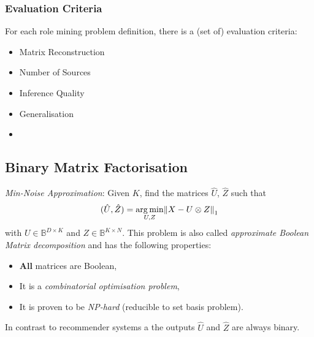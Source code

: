\subsubsection{Evaluation Criteria}
For each role mining problem definition, there is a (set of) evaluation criteria:
\begin{itemize}
\item Matrix Reconstruction
\item Number of Sources
\item Inference Quality
\item Generalisation
\item 
\end{itemize}

\subsection{Binary Matrix Factorisation}
\emph{Min-Noise Approximation}: Given $K$, find the matrices $\hat U$, $\hat Z$ such that
\begin{align*}
    (\hat U, \hat Z) =\argmin_{U,Z} \norm{X-U\otimes Z}_1
\end{align*}
with $U\in \mathbb B^{D\times K}$ and $Z\in \mathbb B^{K\times N}$. This problem is also called \emph{approximate Boolean Matrix decomposition} and has the following properties:
\begin{itemize}
    \item \textbf{All} matrices are Boolean,
    \item It is a \emph{combinatorial optimisation problem},
    \item It is proven to be \emph{NP-hard} (reducible to set basis problem).
\end{itemize}
In contrast to recommender systems a the outputs $\hat U$ and $\hat Z$ are always binary.


